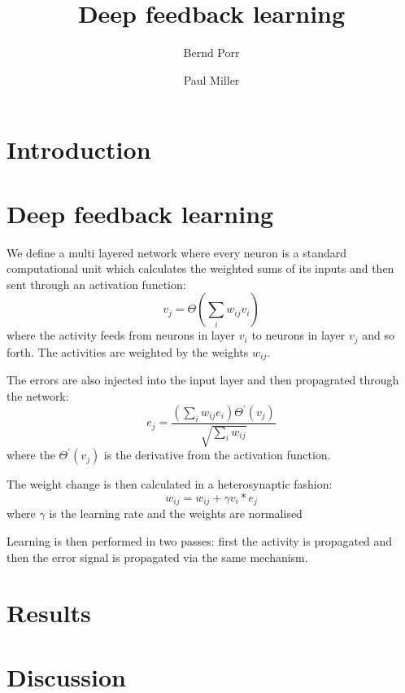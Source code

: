 \documentclass{llncs}
\title{Deep feedback learning}
\author{Bernd Porr \and Paul Miller}
\institute{Glasgow Neuro, bernd,paul@glasgowneuro.tech}
\begin{document}
\maketitle

\begin{abstract}
\end{abstract}

\section{Introduction}

\section{Deep feedback learning}
We define a multi layered network where every neuron is a standard computational
unit which calculates the weighted sums of its inputs and then sent through an
activation function:
\begin{equation}
  v_j = \Theta\left( \sum_i w_{ij} v_{i} \right)
\end{equation}
where the activity feeds from neurons in layer $v_i$ to neurons in layer $v_j$
and so forth. The activities are weighted by the weights $w_{ij}$.

The errors are also injected into the input layer and then propagrated through
the network:
\begin{equation}
  e_j = \frac{\left( \sum_i w_{ij} e_{i} \right) \Theta^\prime (v_j) }{\sqrt{\sum_i w_{ij}}}
\end{equation}
where the $\Theta^\prime (v_j)$ is the derivative from the activation function.

The weight change is then calculated in a heterosynaptic fashion:
\begin{equation}
  w_{ij} = w_{ij} + \gamma v_i * e_j
\end{equation}
where $\gamma$ is the learning rate and the weights are normalised

Learning is then performed in two passes: first the activity is propagated and
then the error signal is propagated via the same mechanism.

\section{Results}

\section{Discussion}




\end{document}

